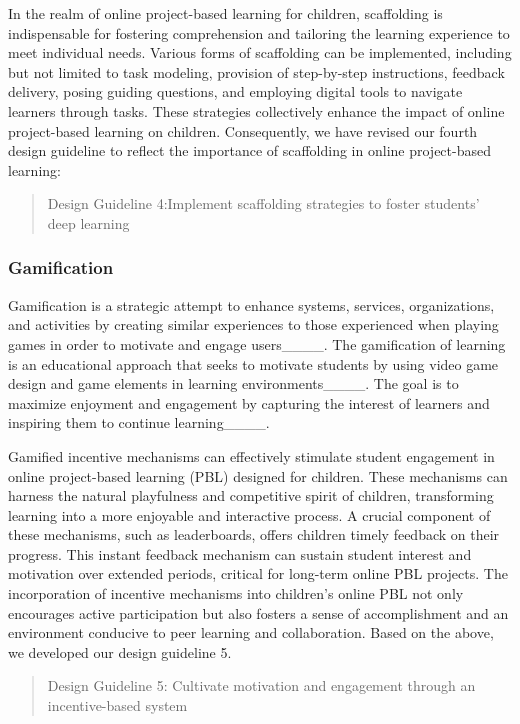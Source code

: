 In the realm of online project-based learning for children, scaffolding is indispensable for fostering comprehension and tailoring the learning experience to meet individual needs. Various forms of scaffolding can be implemented, including but not limited to task modeling, provision of step-by-step instructions, feedback delivery, posing guiding questions, and employing digital tools to navigate learners through tasks. These strategies collectively enhance the impact of online project-based learning on children. Consequently, we have revised our fourth design guideline to reflect the importance of scaffolding in online project-based learning:

 \begin{quote}
  Design Guideline 4:Implement scaffolding strategies to foster students' deep learning
\end{quote}

\subsubsection{Gamification}
Gamification is a strategic attempt to enhance systems, services, organizations, and activities by creating similar experiences to those experienced when playing games in order to motivate and engage users____. The gamification of learning is an educational approach that seeks to motivate students by using video game design and game elements in learning environments____. The goal is to maximize enjoyment and engagement by capturing the interest of learners and inspiring them to continue learning____.

Gamified incentive mechanisms can effectively stimulate student engagement in online project-based learning (PBL) designed for children. These mechanisms can harness the natural playfulness and competitive spirit of children, transforming learning into a more enjoyable and interactive process. A crucial component of these mechanisms, such as leaderboards, offers children timely feedback on their progress. This instant feedback mechanism can sustain student interest and motivation over extended periods, critical for long-term online PBL projects. The incorporation of incentive mechanisms into children's online PBL not only encourages active participation but also fosters a sense of accomplishment and an environment conducive to peer learning and collaboration. Based on the above, we developed our design guideline 5.

\begin{quote}
    Design Guideline 5: Cultivate motivation and engagement through an incentive-based system
\end{quote}